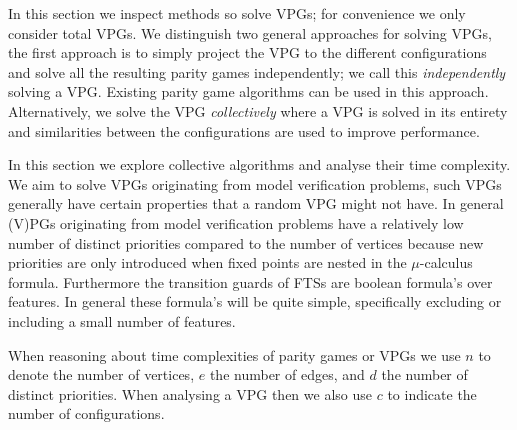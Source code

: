 In this section we inspect methods so solve VPGs; for convenience we only consider total VPGs. We distinguish two general approaches for solving VPGs, the first approach is to simply project the VPG to the different configurations and solve all the resulting parity games independently; we call this \textit{independently} solving a VPG. Existing parity game algorithms can be used in this approach. Alternatively, we solve the VPG \textit{collectively} where a VPG is solved in its entirety and similarities between the configurations are used to improve performance. 

In this section we explore collective algorithms and analyse their time complexity. We aim to solve VPGs originating from model verification problems, such VPGs generally have certain properties that a random VPG might not have. In general (V)PGs originating from model verification problems have a relatively low number of distinct priorities compared to the number of vertices because new priorities are only introduced when fixed points are nested in the $\mu$-calculus formula. Furthermore the transition guards of FTSs are boolean formula's over features. In general these formula's will be quite simple, specifically excluding or including a small number of features.

When reasoning about time complexities of parity games or VPGs we use $n$ to denote the number of vertices, $e$ the number of edges, and $d$ the number of distinct priorities. When analysing a VPG then we also use $c$ to indicate the number of configurations.